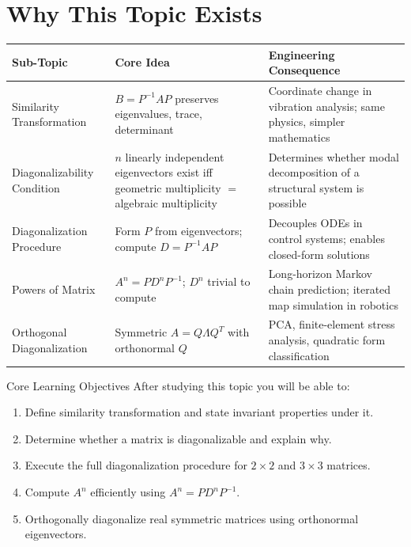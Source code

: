 \documentclass[12pt,a4paper]{article}
\begin{document}
\section{Why This Topic Exists}

\begin{center}
\begin{tabular}{@{}p{3.5cm}p{5cm}p{6cm}@{}}
\toprule
\textbf{Sub-Topic} & \textbf{Core Idea} & \textbf{Engineering Consequence} \\
\midrule
Similarity Transformation & $B = P^{-1}AP$ preserves eigenvalues, trace, determinant & Coordinate change in vibration analysis; same physics, simpler mathematics \\
\addlinespace
Diagonalizability Condition & $n$ linearly independent eigenvectors exist iff geometric multiplicity $=$ algebraic multiplicity & Determines whether modal decomposition of a structural system is possible \\
\addlinespace
Diagonalization Procedure & Form $P$ from eigenvectors; compute $D = P^{-1}AP$ & Decouples ODEs in control systems; enables closed-form solutions \\
\addlinespace
Powers of Matrix & $A^{n} = P D^{n} P^{-1}$; $D^{n}$ trivial to compute & Long-horizon Markov chain prediction; iterated map simulation in robotics \\
\addlinespace
Orthogonal Diagonalization & Symmetric $A = Q\Lambda Q^{T}$ with orthonormal $Q$ & PCA, finite-element stress analysis, quadratic form classification \\
\bottomrule
\end{tabular}
\end{center}

\begin{learnbox}{Core Learning Objectives}
After studying this topic you will be able to:
\begin{enumerate}[leftmargin=*]
  \item Define similarity transformation and state invariant properties under it.
  \item Determine whether a matrix is diagonalizable and explain why.
  \item Execute the full diagonalization procedure for $2\times 2$ and $3\times 3$ matrices.
  \item Compute $A^{n}$ efficiently using $A^{n} = PD^{n}P^{-1}$.
  \item Orthogonally diagonalize real symmetric matrices using orthonormal eigenvectors.
\end{enumerate}
\end{learnbox}
\end{document}
